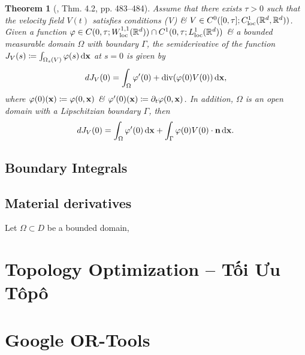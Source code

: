 \documentclass{article}
\newtheorem{theorem}{Theorem}
\begin{document}
\begin{itemize}
	\begin{theorem}[\cite{Delfour_Zolesio2011}, Thm. 4.2, pp. 483--484]
		Assume that there exists $\tau > 0$ such that the velocity field $V(t)$ satisfies conditions (V) \& $V\in C^0([0,\tau];C_{\rm loc}^1(\mathbb{R}^d,\mathbb{R}^d))$. Given a function $\varphi\in C(0,\tau;W_{\rm loc}^{1,1}(\mathbb{R}^d))\cap C^1(0,\tau;L_{\rm loc}^1(\mathbb{R}^d))$ \& a bounded measurable domain $\Omega$ with boundary $\Gamma$, the semiderivative of the function $J_V(s)\coloneqq\int_{\Omega_s(V)} \varphi(s)\,{\rm d}{\bf x}$ at $s = 0$ is given by
		\begin{equation}
			dJ_V(0) = \int_\Omega \varphi'(0) + \operatorname{div}(\varphi(0)V(0))\,{\rm d}{\bf x},
		\end{equation}
		where $\varphi(0)({\bf x})\coloneqq\varphi(0,{\bf x})$ \& $\varphi'(0)({\bf x})\coloneqq\partial_t\varphi(0,{\bf x})$. In addition, $\Omega$ is an open domain with a Lipschitzian boundary $\Gamma$, then
		\begin{equation}
			dJ_V(0) = \int_\Omega \varphi'(0)\,{\rm d}{\bf x} + \int_\Gamma \varphi(0)V(0)\cdot{\bf n}\,{\rm d}{\bf x}.
		\end{equation}
	\end{theorem}

\end{itemize}

\subsection{Boundary Integrals}

\subsection{Material derivatives}
Let $\Omega\subset D$ be a bounded domain,


\section{Topology Optimization -- Tối Ưu Tôpô}


\section{Google OR-Tools}
\end{document}

